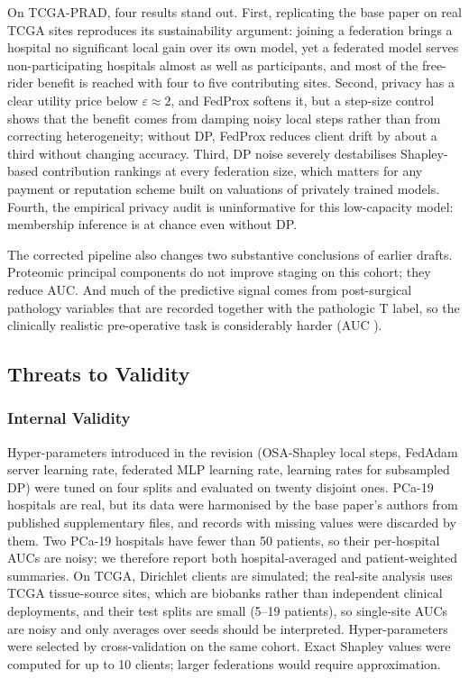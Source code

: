 \documentclass[journal]{IEEEtran}
\begin{document}
On TCGA-PRAD, four results stand out. First, replicating the base paper on real TCGA sites reproduces its sustainability argument: joining a federation brings a hospital no significant local gain over its own model, yet a federated model serves non-participating hospitals almost as well as participants, and most of the free-rider benefit is reached with four to five contributing sites. Second, privacy has a clear utility price below $\varepsilon \approx 2$, and FedProx softens it, but a step-size control shows that the benefit comes from damping noisy local steps rather than from correcting heterogeneity; without DP, FedProx reduces client drift by about a third without changing accuracy. Third, DP noise severely destabilises Shapley-based contribution rankings at every federation size, which matters for any payment or reputation scheme built on valuations of privately trained models. Fourth, the empirical privacy audit is uninformative for this low-capacity model: membership inference is at chance even without DP.

The corrected pipeline also changes two substantive conclusions of earlier drafts. Proteomic principal components do not improve staging on this cohort; they reduce AUC. And much of the predictive signal comes from post-surgical pathology variables that are recorded together with the pathologic T label, so the clinically realistic pre-operative task is considerably harder (AUC \cvPreop{}).

\subsection{Threats to Validity}
\label{sec:threats_validity}

\subsubsection{Internal Validity}
Hyper-parameters introduced in the revision (OSA-Shapley local steps, FedAdam server learning rate, federated MLP learning rate, learning rates for subsampled DP) were tuned on four splits and evaluated on twenty disjoint ones. PCa-19 hospitals are real, but its data were harmonised by the base paper's authors from published supplementary files, and records with missing values were discarded by them. Two PCa-19 hospitals have fewer than 50 patients, so their per-hospital AUCs are noisy; we therefore report both hospital-averaged and patient-weighted summaries. On TCGA, Dirichlet clients are simulated; the real-site analysis uses TCGA tissue-source sites, which are biobanks rather than independent clinical deployments, and their test splits are small (5--19 patients), so single-site AUCs are noisy and only averages over seeds should be interpreted. Hyper-parameters were selected by cross-validation on the same cohort. Exact Shapley values were computed for up to 10 clients; larger federations would require approximation.
\end{document}

